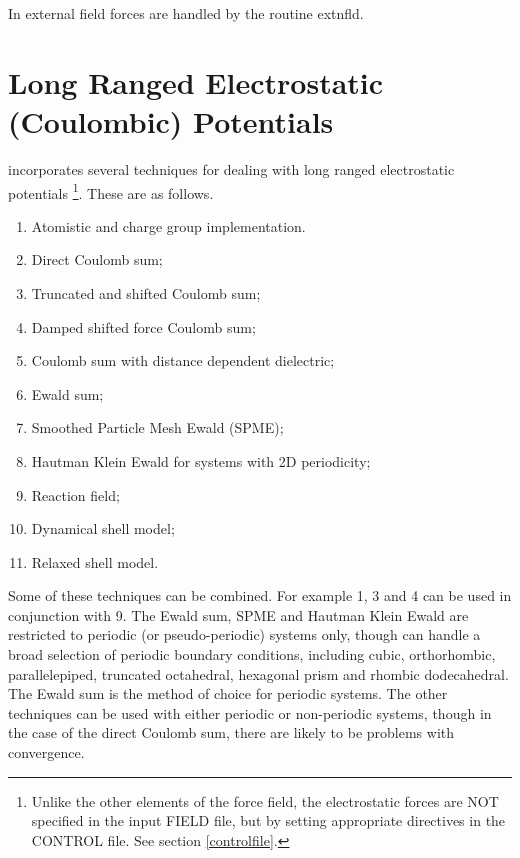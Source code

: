 In \D{} external field forces are handled by the routine {\sc extnfld}.

\section{Long Ranged Electrostatic (Coulombic) Potentials}
\label{coulomb}

\D{} incorporates several techniques for dealing with long
ranged electrostatic potentials
\footnote{Unlike the other elements of the force field, the electrostatic 
forces are NOT specified in the input FIELD file, but by setting 
appropriate directives in the CONTROL  file. See section 
\ref{controlfile}.}. These are as follows. 
\begin{enumerate}
\item Atomistic and charge group implementation.
\item Direct Coulomb sum;
\item Truncated and shifted Coulomb sum;
\item Damped shifted force Coulomb sum;
\item Coulomb sum with distance dependent dielectric;
\item Ewald sum;
\item Smoothed Particle Mesh Ewald (SPME);
\item Hautman Klein Ewald for systems with 2D periodicity;
\item Reaction field;
\item Dynamical shell model;
\item Relaxed shell model.
\end{enumerate}
Some of these techniques can be combined. For example 1, 3 and 4 can
be used in conjunction with 9. The Ewald sum,
SPME and Hautman Klein
Ewald
are restricted to periodic (or pseudo-periodic) systems only, though \D{}
can handle a broad selection of periodic boundary
conditions, including cubic, orthorhombic,
parallelepiped, truncated octahedral, hexagonal prism and rhombic
dodecahedral. The Ewald sum is the method of
choice for periodic systems. The other techniques can be used with
either periodic or non-periodic systems, though in the case of the
direct Coulomb sum, there are likely to be
problems with convergence.

